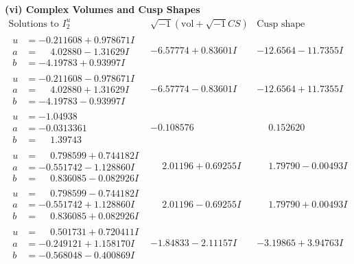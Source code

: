 \documentclass[1p]{elsarticle_modified}
\theoremstyle{definition}
\newcommand{\I}{\sqrt{-1}}
\begin{document}
\newpage\flushleft \textbf{(vi) Complex Volumes and Cusp Shapes}
$$\begin{array}{c|c|c}  
\text{Solutions to }I^u_{2}& \I (\text{vol} + \sqrt{-1}CS) & \text{Cusp shape}\\
 \hline 
\begin{aligned}
u &= -0.211608 + 0.978671 I \\
a &= \phantom{-}4.02880 - 1.31629 I \\
b &= -4.19783 + 0.93997 I\end{aligned}
 & -6.57774 + 0.83601 I & -12.6564 - 11.7355 I \\ \hline\begin{aligned}
u &= -0.211608 - 0.978671 I \\
a &= \phantom{-}4.02880 + 1.31629 I \\
b &= -4.19783 - 0.93997 I\end{aligned}
 & -6.57774 - 0.83601 I & -12.6564 + 11.7355 I \\ \hline\begin{aligned}
u &= -1.04938\phantom{ +0.000000I} \\
a &= -0.0313361\phantom{ +0.000000I} \\
b &= \phantom{-}1.39743\phantom{ +0.000000I}\end{aligned}
 & -0.108576\phantom{ +0.000000I} & \phantom{-}0.152620\phantom{ +0.000000I} \\ \hline\begin{aligned}
u &= \phantom{-}0.798599 + 0.744182 I \\
a &= -0.551742 - 1.128860 I \\
b &= \phantom{-}0.836085 - 0.082926 I\end{aligned}
 & \phantom{-}2.01196 + 0.69255 I & \phantom{-}1.79790 - 0.00493 I \\ \hline\begin{aligned}
u &= \phantom{-}0.798599 - 0.744182 I \\
a &= -0.551742 + 1.128860 I \\
b &= \phantom{-}0.836085 + 0.082926 I\end{aligned}
 & \phantom{-}2.01196 - 0.69255 I & \phantom{-}1.79790 + 0.00493 I \\ \hline\begin{aligned}
u &= \phantom{-}0.501731 + 0.720411 I \\
a &= -0.249121 + 1.158170 I \\
b &= -0.568048 - 0.400869 I\end{aligned}
 & -1.84833 - 2.11157 I & -3.19865 + 3.94763 I \\ \hline\begin{aligned}

\end{aligned}
\end{array}$$
\end{document}
